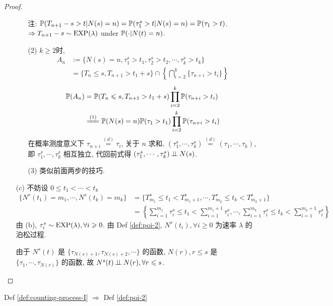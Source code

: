 \begin{proof}
\begin{enumerate}
\begin{enumerate}
        注: $\mathbb{P}(T_{n+1}-s>t|N(s)=n)=\mathbb{P}(\tau_1^s>t|N(s)=n)=\mathbb{P}(\tau_1>t)$. $\Rightarrow T_{n+1}-s\sim \operatorname{EXP}(\lambda)$ under $\mathbb{P}(\cdot|N(t)=n)$.
        \item[(2)] $k\geq 2$时, 
        \[
        \begin{aligned}
            A_n &:=\{N(s)=n,\tau_1^s>t_1,\tau_2^s>t_2,\cdots, \tau_k^s>t_k\}\\
            &=\{T_n\leq s,T_{n+1}>t_1+s\}\cap \left\{\bigcap_{i=2}^k \{\tau_{n+i}>t_i\}\right\}
        \end{aligned}
        \]
        \[
        \begin{aligned}
            \PP(A_n) &=\PP(T_n\leq s, T_{n+1}>t_1+s)\prod_{i=2}^k \PP(\tau_{n+i}>t_i)\\
            &\xlongequal{(1)}\PP(N(s)=n)\PP(\tau_1>t_1)\prod_{i=2}^k\PP(\tau_{n+i}>t_i)
        \end{aligned}
        \]
        在概率测度意义下 $\tau_{n+i}\overset{(d)}{=}\tau_i$, 关于 $n$ 求和, $(\tau_1^s,\cdots,\tau_k^s)\overset{(d)}{=}(\tau_1,\cdots,\tau_k)$, 即 $\tau_1^s,\cdots,\tau_k^s$ 相互独立, 代回前式得 $(\tau_1^s,\cdots,\tau_k^s)\operatorname{\perp\!\!\!\perp} N(s)$.
        \item[(3)] 类似前面两步的技巧.
    \end{enumerate}
    \item[(c)] 不妨设 $0\leq t_1<\cdots<t_k$
    \[
    \begin{aligned}
        \{N^s(t_1)=m_1,\cdots,N^s(t_k)=m_k\} &=\{T_{m_1}^s\leq t_1< T_{m_1+1}^s,\cdots,T_{m_k}^s\leq t_k< T_{m_k+1}^s\}\\
        &=\left\{\sum_{i=1}^{m_1}\tau_i^s\leq t_1<\sum_{i=1}^{m_1+1}\tau_i^s,\cdots,\sum_{i=1}^{m_k}\tau_i^s\leq t_k<\sum_{i=1}^{m_k+1}\tau_i^s\right\}
    \end{aligned}
    \]
    由 (b), $\tau_i^s\sim \operatorname{EXP}(\lambda),\forall i\geqslant 0$. 由 Def \ref{def:poi-2}, $N^s(t_i),\forall i\geq 0$ 为速率 $\lambda$ 的泊松过程. 
    
    由于 $N^s(t)$ 是 $\{\tau_{N(s)+1},\tau_{N(s)+2},\cdots\}$ 的函数, $N(r),r\leq s$ 是 $\{\tau_1,\cdots,\tau_{N(r)}\}$ 的函数, 故 $N^s(t)\operatorname{\perp\!\!\!\perp} N(r),\forall r\leqslant s$.
\end{enumerate}
\end{proof}

\begin{proposition}
    Def \ref{def:counting-process-I} $\Rightarrow$ Def \ref{def:poi-2}
\end{proposition}

